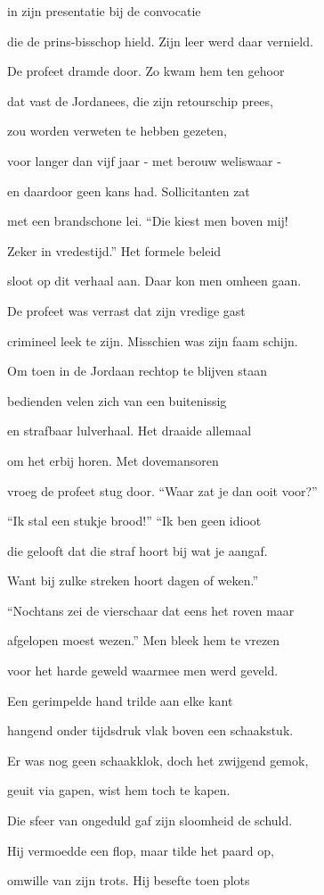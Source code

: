 in zijn presentatie
bij de convocatie

die de prins-bisschop hield.
Zijn leer werd daar vernield.

De profeet dramde door.
Zo kwam hem ten gehoor

dat vast de Jordanees,
die zijn retourschip prees,

zou worden verweten
te hebben gezeten,

voor langer dan vijf jaar
- met berouw weliswaar -

en daardoor geen kans had.
Sollicitanten zat

met een brandschone lei.
“Die kiest men boven mij!

Zeker in vredestijd.”
Het formele beleid

sloot op dit verhaal aan.
Daar kon men omheen gaan.

De profeet was verrast
dat zijn vredige gast

crimineel leek te zijn.
Misschien was zijn faam schijn.

Om toen in de Jordaan
rechtop te blijven staan

bedienden velen zich
van een buitenissig

en strafbaar lulverhaal.
Het draaide allemaal

om het erbij horen.
Met dovemansoren

vroeg de profeet stug door.
“Waar zat je dan ooit voor?”

“Ik stal een stukje brood!”
“Ik ben geen idioot

die gelooft dat die straf
hoort bij wat je aangaf.

Want bij zulke streken
hoort dagen of weken.”

“Nochtans zei de vierschaar
dat eens het roven maar

afgelopen moest wezen.”
Men bleek hem te vrezen

voor het harde geweld
waarmee men werd geveld.

Een gerimpelde hand
trilde aan elke kant

hangend onder tijdsdruk
vlak boven een schaakstuk.

Er was nog geen schaakklok,
doch het zwijgend gemok,

geuit via gapen,
wist hem toch te kapen.

Die sfeer van ongeduld
gaf zijn sloomheid de schuld.

Hij vermoedde een flop,
maar tilde het paard op,

omwille van zijn trots.
Hij besefte toen plots

